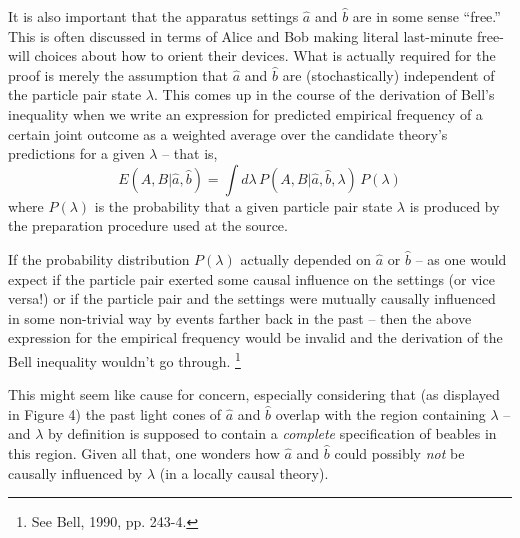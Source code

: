 \documentclass[aps,prc,twocolumn]{revtex4}
\begin{document}
It is also important that the apparatus settings $\hat{a}$ and
$\hat{b}$ are in some sense ``free.''  This is often discussed in
terms of Alice and Bob making literal last-minute free-will choices
about how to orient their devices.  What is actually required for the
proof is merely the assumption that $\hat{a}$ and $\hat{b}$ are
(stochastically)
independent of the particle pair state $\lambda$.
This comes up in the course of the derivation of Bell's inequality
when we write an expression for predicted empirical frequency of a certain
joint outcome as a weighted average over the candidate theory's
predictions for a given $\lambda$ -- that is,
\begin{equation}
E(A,B|\hat{a},\hat{b}) = \int d\lambda \, P(A,B|\hat{a},\hat{b},\lambda)
\, P(\lambda)
\end{equation}
where $P(\lambda)$ is the probability that a given particle pair state
$\lambda$ is produced by the preparation procedure used at the source.

If the probability distribution $P(\lambda)$ actually depended on
$\hat{a}$ or $\hat{b}$ -- as one would expect if the 
particle pair exerted some causal influence on the settings (or vice
versa!) or if the particle pair and the settings were mutually causally
influenced in some non-trivial way by events farther back in the past
-- then the above expression for the empirical frequency would be
invalid and the derivation of the Bell inequality wouldn't go through.
\footnote{See Bell, 1990, pp. 243-4.}

This might seem like cause for concern, especially considering that
(as displayed in Figure 4) the past light cones of $\hat{a}$ and
$\hat{b}$ overlap with the region containing
$\lambda$ -- and $\lambda$ by definition is supposed
to contain a \emph{complete} specification of beables in this region.
Given all that, one wonders how $\hat{a}$ and $\hat{b}$ could possibly
\emph{not} be causally influenced by $\lambda$ (in a locally causal
theory).  
\end{document}
